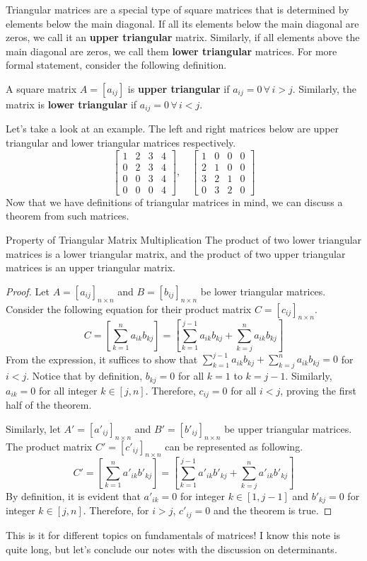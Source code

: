 \documentclass[../main.tex]{subfiles}
\begin{document}
Triangular matrices are a special type of square matrices that is
determined by elements below the main diagonal. If all its
elements below the main diagonal are zeros, we call it an
\textbf{upper triangular} matrix. Similarly, if all elements above
the main diagonal are zeros, we call them \textbf{lower triangular}
matrices. For more formal statement, consider the following
definition.

\begin{definition}{}{}
A square matrix $A = [a_{ij}]$ is \textbf{upper triangular} if
$a_{ij} = 0 \, \forall \, i > j$. Similarly, the matrix is
\textbf{lower triangular} if $a_{ij} = 0 \, \forall \, i < j$.
\end{definition}

Let's take a look at an example. The left and right matrices below
are upper triangular and lower triangular matrices respectively.
\[
\begin{bmatrix}
    1 & 2 & 3 & 4 \\
    0 & 2 & 3 & 4 \\
    0 & 0 & 3 & 4 \\
    0 & 0 & 0 & 4
\end{bmatrix},
\quad
\begin{bmatrix}
    1 & 0 & 0 & 0 \\
    2 & 1 & 0 & 0 \\
    3 & 2 & 1 & 0 \\
    0 & 3 & 2 & 0
\end{bmatrix}
\]
Now that we have definitions of triangular matrices in mind,
we can discuss a theorem from such matrices.

\begin{theorem}{}{Property of Triangular Matrix Multiplication}
The product of two lower triangular matrices is a lower triangular
matrix, and the product of two upper triangular matrices is an upper
triangular matrix.
\end{theorem}
\begin{proof}
Let $A = [a_{ij}]_{n \times n}$ and $B = [b_{ij}]_{n \times n}$ be
lower triangular matrices. Consider the following equation for their
product matrix $C = [c_{ij}]_{n \times n}$.
\[
C
= \left[ \sum_{k = 1}^{n} a_{ik} b_{kj} \right]
= \left[
    \sum_{k = 1}^{j-1} a_{ik} b_{kj}
        + \sum_{k = j}^{n} a_{ik} b_{kj}
\right]
\]
From the expression, it suffices to show that $\sum_{k = 1}^{j-1}
a_{ik} b_{kj} + \sum_{k = j}^{n} a_{ik} b_{kj} = 0$ for $i < j$.
Notice that by definition, $b_{kj} = 0$ for all $k = 1$ to $k = j-1$.
Similarly, $a_{ik} = 0$ for all integer $k \in [j, n]$. Therefore,
$c_{ij} = 0$ for all $i < j$, proving the first half of the theorem.

Similarly, let $A' = [a'_{ij}]_{n \times n}$ and $B' =
[b'_{ij}]_{n \times n}$ be upper triangular matrices. The product
matrix $C'= [c'_{ij}]_{n \times n}$ can be represented as following.
\[
C'
= \left[ \sum_{k = 1}^{n} a'_{ik} b'_{kj} \right]
= \left[
    \sum_{k = 1}^{j-1} a'_{ik} b'_{kj}
        + \sum_{k = j}^{n} a'_{ik} b'_{kj}
\right]
\]
By definition, it is evident that $a'_{ik} = 0$ for integer $k
\in [1, j-1]$ and $b'_{kj} = 0$ for integer $k \in [j, n]$.
Therefore, for $i > j$, $c'_{ij} = 0$ and the theorem is true.
\end{proof}

This is it for different topics on fundamentals of matrices! I know
this note is quite long, but let's conclude our notes with the
discussion on determinants.
\end{document}
